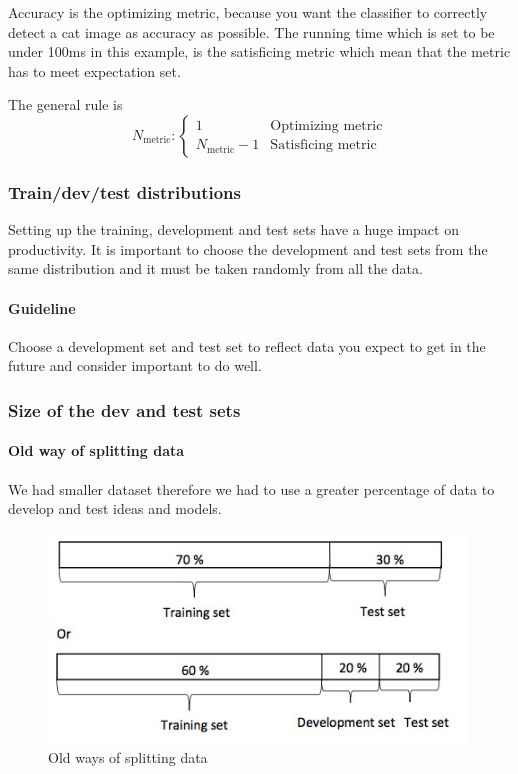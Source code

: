 \documentclass[UTF8]{article}
\begin{document}
Accuracy is the optimizing metric, because you want the classifier to correctly detect a cat image
as accuracy as possible. The running time which is set to be under 100ms in this example, is the
satisficing metric which mean that the metric has to meet expectation set.

The general rule is
$$ N_{\text{metric}}: \left\{\begin{array}{ll} 1 & \text{Optimizing metric} \\ N_{\text{metric}}-1
& \text{Satisficing metric} \end{array}\right. $$

\subsubsection{Train/dev/test distributions}
Setting up the training, development and test sets have a huge impact on productivity. It is
important to choose the development and test sets from the same distribution and it must be taken
randomly from all the data.

\paragraph{Guideline} Choose a development set and test set to reflect data you expect to get in
the future and consider important to do well.

\subsubsection{Size of the dev and test sets}
\paragraph{Old way of splitting data}
We had smaller dataset therefore we had to use a greater percentage of data to develop and test
ideas and models.

\begin{figure}[htb]
    \centering
    \includegraphics[width=30em]{figures/old-ways-splitting-data}
    \caption{Old ways of splitting data}
    \label{figures/old-ways-splitting-data}
\end{figure}
\end{document}
